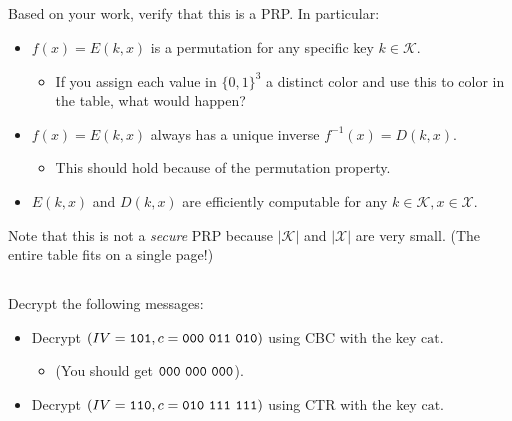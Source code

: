 \documentclass[12pt]{article}
\let\sol=\undefined
\newcommand{\sol}[1]{}
\begin{document}
\newpage
\subsection{}

Based on your work, verify that this is a PRP. In particular:

\begin{itemize}
\item $f(x) = E(k, x)$ is a permutation for any specific key $k \in \mathcal{K}$.
\begin{itemize}
\item If you assign each value in $\{0, 1\}^3$ a distinct color and use this to color in the table, what would happen?
\end{itemize}
\item $f(x) = E(k, x)$ always has a unique inverse $f^{-1}(x) = D(k, x)$.
\begin{itemize}
\item This should hold because of the permutation property.
\end{itemize}
\item $E(k, x)$ and $D(k, x)$ are efficiently computable for any $k \in \mathcal{K}, x \in \mathcal{X}$.
\end{itemize}

Note that this is not a \emph{secure} PRP because $|\mathcal{K}|$ and $|\mathcal{X}|$ are very small. (The entire table fits on a single page!)

\subsection{}

Decrypt the following messages:

\begin{itemize}
\item Decrypt $(IV = {\tt 101}, c = {\tt 000~011~010 })$ using CBC with the key $\text{cat}$.
\begin{itemize}
\item (You should get ${\tt 000~000~000}$).
\end{itemize}
\item Decrypt $(IV = {\tt 110}, c = {\tt 010~111~111})$ using CTR with the key $\text{cat}$. \sol{${\tt 100~000~100}$} 
\end{itemize}

\section{}
\end{document}
